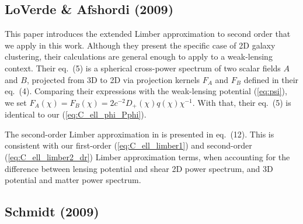 \documentclass[fleqn,usenatbib]{mnras} %
\begin{document}
\begin{appendix}
\begin{figure}
    \label{fig:L1L2E_Rijt}

\end{figure}



\subsection{LoVerde \& Afshordi (2009)}

This paper introduces the extended Limber approximation to second order that we
apply in this work. Although they present the specific case of 2D galaxy
clustering, their calculations are general enough to apply to a weak-lensing
context. Their eq.~(5) is a spherical cross-power spectrum of two scalar fields
$A$ and $B$, projected from 3D to 2D via projection kernels $F_A$ and $F_B$
defined in their eq.~(4). Comparing their expressions with the weak-lensing
potential (\ref{eq:psi}), we set $F_A(\chi) = F_B(\chi) = 2 c^{-2}
D_+(\chi) q(\chi) \chi^{-1}$. With that, their eq.~(5) is identical to our
(\ref{eq:C_ell_phi_Pphi}).

The second-order Limber approximation in \cite{2008PhRvD..78l3506L} is
presented in eq.~(12). This is consistent with our first-order
(\ref{eq:C_ell_limber1}) and second-order (\ref{eq:C_ell_limber2_dr}) Limber
approximation terms, when accounting for the difference between lensing
potential and shear 2D power spectrum, and 3D potential and matter power
spectrum.


\subsection{Schmidt (2009)}
\label{sec:schmidt08}


\end{appendix}
\end{document}
